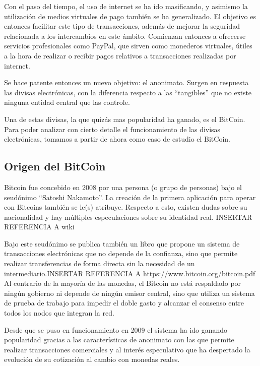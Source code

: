 Con el paso del tiempo, el uso de internet se ha ido masificando, y asimismo la utilizaci\'on de medios virtuales de pago tambi\'en se ha
generalizado. El objetivo es entonces facilitar este tipo de transacciones, adem\'as de mejorar la seguridad relacionada a los intercambios en este \'ambito. Comienzan entonces a ofrecerse servicios profesionales como PayPal, que sirven como monederos virtuales, \'utiles a la hora de realizar o recibir pagos relativos a transacciones realizadas por internet.

Se hace patente entonces un nuevo objetivo: el anonimato. Surgen en respuesta las divisas electr\'onicas, con la diferencia respecto a las ``tangibles'' que no existe ninguna entidad central que las controle.

Una de estas divisas, la que quiz\'as mas popularidad ha ganado, es el BitCoin. Para poder analizar con cierto detalle el funcionamiento de las divisas electr\'onicas, tomamos a partir de ahora como caso de estudio el BitCoin.

\subsection{Origen del BitCoin}

Bitcoin fue concebido en 2008 por una persona (o grupo de personas) bajo el seud\'onimo ``Satoshi Nakamoto''. La creaci\'on de la primera aplicaci\'on para operar con Bitcoins tambi\'en se le(s) atribuye. Respecto a esto, existen dudas sobre su nacionalidad y hay m\'ultiples especulaciones sobre su identidad real. INSERTAR REFERENCIA A wiki

Bajo este seud\'onimo se publica tambi\'en un libro que propone un sistema de transacciones electr\'onicas que no depende de la confianza, sino que permite realizar transferencias de forma directa sin la necesidad de un intermediario.INSERTAR REFERENCIA A https://www.bitcoin.org/bitcoin.pdf Al contrario de la mayor\'ia de las monedas, el Bitcoin no est\'a respaldado por ning\'un gobierno ni depende de ning\'un emisor central, sino que utiliza un sistema de prueba de trabajo para impedir el doble gasto y alcanzar el consenso entre todos los nodos que integran la red.

Desde que se puso en funcionamiento en 2009 el sistema ha ido ganando popularidad gracias a las caracter\'isticas de anonimato con las que permite realizar transacciones comerciales y al inter\'es especulativo que ha despertado la evoluci\'on de su cotizaci\'on al cambio con monedas reales.

